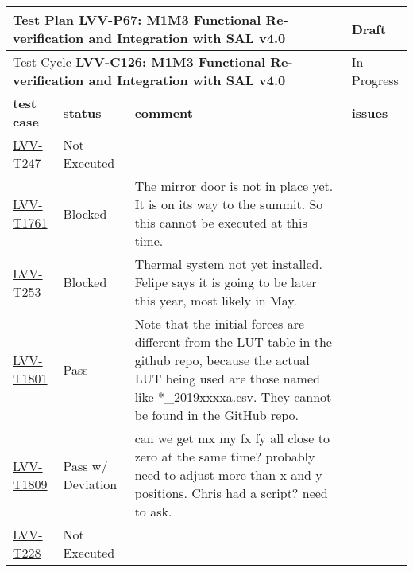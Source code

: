 \documentclass[SE,lsstdraft,STR,toc]{lsstdoc}
\begin{document}
\begin{longtable}{p{2cm}p{2.5cm}p{9cm}p{2.5cm}}
\toprule
\multicolumn{3}{p{13.5cm}}{ Test Plan {\bf LVV-P67: M1M3 Functional Re-verification and Integration with SAL v4.0 }} & Draft \\\hline

  \multicolumn{3}{p{13.5cm}}{ Test Cycle {\bf LVV-C126: M1M3 Functional Re-verification and Integration with SAL v4.0 }} & In Progress \\\hline

  {\bf \footnotesize test case} & {\bf \footnotesize status} & {\bf \footnotesize comment} & {\bf \footnotesize issues} \\\toprule

    \href{https://jira.lsstcorp.org/secure/Tests.jspa#/testCase/LVV-T247}{LVV-T247}
    & Not Executed &
    \begin{minipage}[]{9cm}
    \smallskip
    
    \medskip
    \end{minipage}
    &
    \\\hline
    \href{https://jira.lsstcorp.org/secure/Tests.jspa#/testCase/LVV-T1761}{LVV-T1761}
    & Blocked &
    \begin{minipage}[]{9cm}
    \smallskip
    The mirror door is not in place yet. It is on its way to the summit. So
this cannot be executed at this time.
    \medskip
    \end{minipage}
    &
    \\\hline
    \href{https://jira.lsstcorp.org/secure/Tests.jspa#/testCase/LVV-T253}{LVV-T253}
    & Blocked &
    \begin{minipage}[]{9cm}
    \smallskip
    Thermal system not yet installed. Felipe says it is going to be later
this year, most likely in May.
    \medskip
    \end{minipage}
    &
    \\\hline
    \href{https://jira.lsstcorp.org/secure/Tests.jspa#/testCase/LVV-T1801}{LVV-T1801}
    & Pass &
    \begin{minipage}[]{9cm}
    \smallskip
    Note that the initial forces are different from the LUT table in the
github repo, because the actual LUT being used are those named like
*\_2019xxxxa.csv. They cannot be found in the GitHub repo.
    \medskip
    \end{minipage}
    &
    \\\hline
    \href{https://jira.lsstcorp.org/secure/Tests.jspa#/testCase/LVV-T1809}{LVV-T1809}
    & Pass w/ Deviation &
    \begin{minipage}[]{9cm}
    \smallskip
    can we get mx my fx fy all close to zero at the same time? probably need
to adjust more than x and y positions. Chris had a script? need to ask.
    \medskip
    \end{minipage}
    &
    \\\hline
    \href{https://jira.lsstcorp.org/secure/Tests.jspa#/testCase/LVV-T228}{LVV-T228}
    & Not Executed &
    \begin{minipage}[]{9cm}
    \smallskip
    

\end{minipage}
\end{longtable}
\end{document}
